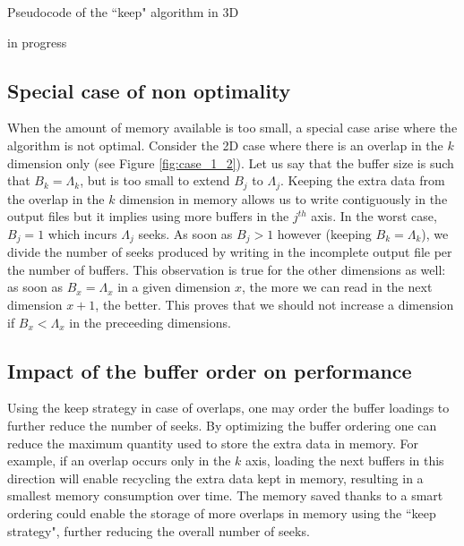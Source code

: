 \documentclass[conference]{IEEEtran}
\begin{document}
\begin{algorithm}[h]
  \caption{Pseudocode of the ``keep" algorithm in 3D}

  \begin{algorithmic}[1]
  \STATE in progress
  \end{algorithmic}
  \label{algo:keep_algorithm_3D}

\end{algorithm}

\subsection{Special case of non optimality}
When the amount of memory available is too small, a special case arise where the algorithm is not optimal.
Consider the 2D case where there is an overlap in the $k$ dimension only (see Figure \ref{fig:case_1_2}).
Let us say that the buffer size is such that $B_k = \Lambda_k$, but is too small to extend $B_j$ to $\Lambda_j$.
Keeping the extra data from the overlap in the $k$ dimension in memory allows us to write contiguously in the output files but it implies using more buffers in the $j^{th}$ axis.
In the worst case, $B_j = 1$ which incurs $\Lambda_j$ seeks.
As soon as $B_j > 1$ however (keeping $B_k = \Lambda_k$), we divide the number of seeks produced by writing in the incomplete output file per the number of buffers.
This observation is true for the other dimensions as well: as soon as $B_x = \Lambda_x$ in a given dimension $x$, the more we can read in the next dimension $x+1$, the better.
This proves that we should not increase a dimension if $B_x < \Lambda_x$ in the preceeding dimensions.

\subsection{Impact of the buffer order on performance}
Using the keep strategy in case of overlaps, one may order the buffer loadings to further reduce the number of seeks.
By optimizing the buffer ordering one can reduce the maximum quantity used to store the extra data in memory.
For example, if an overlap occurs only in the $k$ axis, loading the next buffers in this direction will enable recycling the extra data kept in memory, resulting in a smallest memory consumption over time.
The memory saved thanks to a smart ordering could enable the storage of more overlaps in memory using the ``keep strategy", further reducing the overall number of seeks. \\
\end{document}
